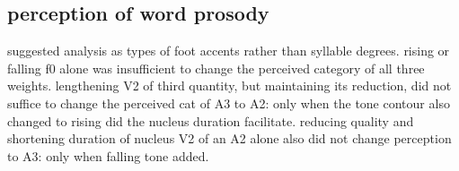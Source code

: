 %
%
%
%
\subsection{perception of word prosody}




suggested analysis as types of foot accents rather than syllable degrees. 
rising or falling f0 alone was insufficient to change the perceived category of all three weights.
lengthening V2 of third quantity, but maintaining its reduction, did not suffice to change the perceived cat of A3 to A2: only when the tone contour also changed to rising did the nucleus duration facilitate. 
reducing quality and shortening duration of nucleus V2 of an A2 alone also did not change perception to A3: only when falling tone added.
\citep{eekSimplePerceptionExperiments1997}




